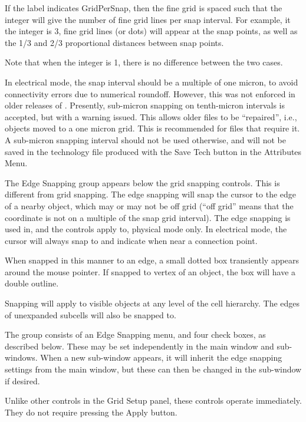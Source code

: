 \begin{description}
If the label indicates {\cb GridPerSnap}, then the fine grid is spaced
such that the integer will give the number of fine grid lines per snap
interval.  For example, it the integer is 3, fine grid lines (or dots)
will appear at the snap points, as well as the 1/3 and 2/3
proportional distances between snap points.

Note that when the integer is 1, there is no difference between the
two cases.

In electrical mode, the snap interval should be a multiple of one
micron, to avoid connectivity errors due to numerical roundoff. 
However, this was not enforced in older releases of {\Xic}. 
Presently, sub-micron snapping on tenth-micron intervals is accepted,
but with a warning issued.  This allows older files to be
``repaired'', i.e., objects moved to a one micron grid.  This is
recommended for files that require it.  A sub-micron snapping interval
should not be used otherwise, and will not be saved in the technology
file produced with the {\cb Save Tech} button in the {\cb Attributes
Menu}.
\end{description}

The {\cb Edge Snapping} group appears below the grid snapping
controls.  This is different from grid snapping.  The edge snapping
will snap the cursor to the edge of a nearby object, which may or may
not be off grid (``off grid'' means that the coordinate is not on a
multiple of the snap grid interval).  The edge snapping is used in,
and the controls apply to, physical mode only.  In electrical mode,
the cursor will always snap to and indicate when near a connection
point.

When snapped in this manner to an edge, a small dotted box transiently
appears around the mouse pointer.  If snapped to vertex of an object,
the box will have a double outline.

Snapping will apply to visible objects at any level of the cell
hierarchy.  The edges of unexpanded subcells will also be snapped to.

The group consists of an {\cb Edge Snapping} menu, and four check
boxes, as described below.  These may be set independently in the main
window and sub-windows.  When a new sub-window appears, it will
inherit the edge snapping settings from the main window, but these can
then be changed in the sub-window if desired.

Unlike other controls in the {\cb Grid Setup} panel, these controls
operate immediately.  They do not require pressing the {\cb Apply}
button.

